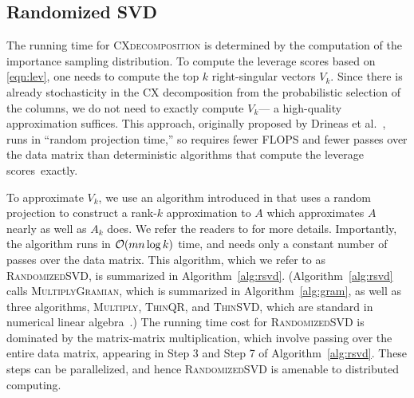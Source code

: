 \subsection{Randomized SVD}

The running time for \textsc{CXdecomposition} is determined by the
computation of the importance sampling distribution.  To compute the leverage
scores based on \eqref{eqn:lev}, one needs to compute the top
$k$ right-singular vectors $V_k$. Since there is already stochasticity in the 
CX decomposition from the probabilistic selection of the columns, we 
do not need to exactly compute $V_k$--- a high-quality approximation suffices. 
This approach, originally proposed by Drineas et al.~\cite{DMMW12_JMLR}, runs in
``random projection time,'' so requires fewer FLOPS and fewer passes over
the data matrix than deterministic algorithms that compute the
leverage scores~exactly.

To approximate $V_k$, we use an algorithm introduced in \cite{MRT06,MRT11}
that uses a random projection to construct a rank-$k$ approximation to $A$
which approximates $A$ nearly as well as $A_k$ does.  We refer the readers to
\cite{HMT09_SIREV,Mah-mat-rev_BOOK} for more details.  Importantly, the
algorithm runs in $\operatorname{\mathcal{O}}(mn \log k)$ time, and needs only a
constant number of passes over the data matrix.  This algorithm, which
we refer to as \textsc{RandomizedSVD}, is summarized in
Algorithm~\ref{alg:rsvd}.  (Algorithm~\ref{alg:rsvd} calls
\textsc{MultiplyGramian}, which is summarized in Algorithm~\ref{alg:gram}, as
well as three algorithms, \textsc{Multiply}, \textsc{ThinQR}, and
\textsc{ThinSVD}, which are standard in numerical linear algebra~\cite{GVL96}.)
The running time cost for \textsc{RandomizedSVD} is dominated by the
matrix-matrix multiplication, which involve passing over the entire data
matrix, appearing in Step 3 and Step 7 of Algorithm~\ref{alg:rsvd}.  
These steps can be parallelized, and hence \textsc{RandomizedSVD} is 
amenable to distributed computing.

